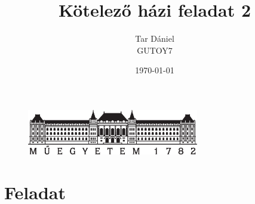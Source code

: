 \documentclass{article}
\begin{document}
	
	\begin{titlepage}
		\setlength{\headheight}{20pt}
		\title{\huge Kötelező házi feladat 2
		}
		\author{Tar Dániel\\GUTOY7}
		\date{\today}
		\maketitle
		\thispagestyle{fancy}
		
		\begin{figure}
			\begin{center}
				\includegraphics[height=2cm]{logo_bme_kicsi.eps}
			\end{center}
		\end{figure}
		
	\end{titlepage}
	\newpage

	 
	\newpage
	
	
	\setlength{\headheight}{0pt}
	\tableofcontents
	\newpage
	
	\setcounter{page}{1}

	
	
	

	
	
	\section{Feladat}
	
\end{document}
